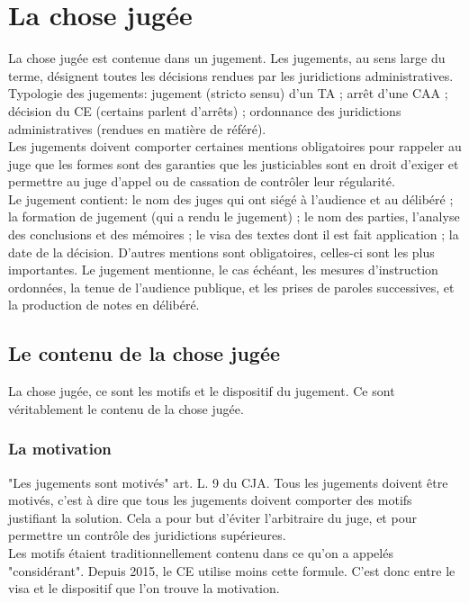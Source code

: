\documentclass[10pt, a4paper, openany]{book}
\begin{document}
\section{La chose jugée}

La chose jugée est contenue dans un jugement. Les jugements, au sens large du terme, désignent toutes les décisions rendues par les juridictions administratives. \\
Typologie des jugements: jugement (stricto sensu) d'un TA ; arrêt d'une CAA ; décision du CE (certains parlent d'arrêts) ; ordonnance des juridictions administratives (rendues en matière de référé). \\
Les jugements doivent comporter certaines mentions obligatoires pour rappeler au juge que les formes sont des garanties que les justiciables sont en droit d'exiger et permettre au juge d'appel ou de cassation de contrôler leur régularité. \\
Le jugement contient: le nom des juges qui ont siégé à l'audience et au délibéré ; la formation de jugement (qui a rendu le jugement) ; le nom des parties, l'analyse des conclusions et des mémoires ; le visa des textes dont il est fait application ; la date de la décision. D'autres mentions sont obligatoires, celles-ci sont les plus importantes. Le jugement mentionne, le cas échéant, les mesures d'instruction ordonnées, la tenue de l'audience publique, et les prises de paroles successives, et la production de notes en délibéré.

\subsection{Le contenu de la chose jugée}

La chose jugée, ce sont les motifs et le dispositif du jugement. Ce sont véritablement le contenu de la chose jugée. 

\subsubsection{La motivation}

"Les jugements sont motivés" art. L. 9 du CJA. Tous les jugements doivent être motivés, c'est à dire que tous les jugements doivent comporter des motifs justifiant la solution. Cela a pour but d'éviter l'arbitraire du juge, et pour permettre un contrôle des juridictions supérieures. \\
Les motifs étaient traditionnellement contenu dans ce qu'on a appelés "considérant". Depuis 2015, le CE utilise moins cette formule. C'est donc entre le visa et le dispositif que l'on trouve la motivation. 
\end{document}
